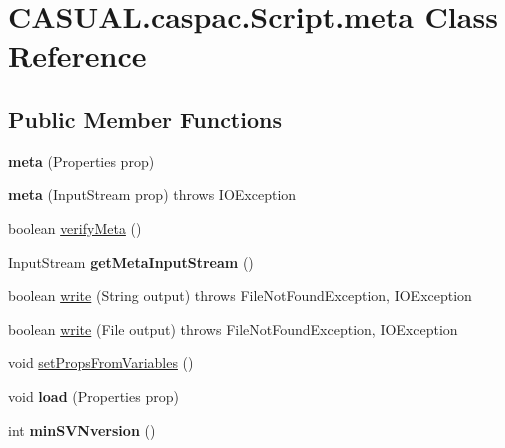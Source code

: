 \hypertarget{classCASUAL_1_1caspac_1_1Script_1_1meta}{\section{C\-A\-S\-U\-A\-L.\-caspac.\-Script.\-meta Class Reference}
\label{classCASUAL_1_1caspac_1_1Script_1_1meta}
}
\subsection*{Public Member Functions}
\begin{DoxyCompactItemize}
\item 
\hypertarget{classCASUAL_1_1caspac_1_1Script_1_1meta_a261edd605871c12eae55492b767f5d91}{{\bfseries meta} (Properties prop)}\label{classCASUAL_1_1caspac_1_1Script_1_1meta_a261edd605871c12eae55492b767f5d91}

\item 
\hypertarget{classCASUAL_1_1caspac_1_1Script_1_1meta_a82642004af42f27e39b25701f959366c}{{\bfseries meta} (Input\-Stream prop)  throws I\-O\-Exception }\label{classCASUAL_1_1caspac_1_1Script_1_1meta_a82642004af42f27e39b25701f959366c}

\item 
boolean \hyperlink{classCASUAL_1_1caspac_1_1Script_1_1meta_a4340eebaf11efe0a5be240ac719287c9}{verify\-Meta} ()
\item 
\hypertarget{classCASUAL_1_1caspac_1_1Script_1_1meta_ac00ebebaaa934593f664e4f8a992dac1}{Input\-Stream {\bfseries get\-Meta\-Input\-Stream} ()}\label{classCASUAL_1_1caspac_1_1Script_1_1meta_ac00ebebaaa934593f664e4f8a992dac1}

\item 
boolean \hyperlink{classCASUAL_1_1caspac_1_1Script_1_1meta_abd994423729ec381ff3d2ce236981533}{write} (String output)  throws File\-Not\-Found\-Exception, I\-O\-Exception 
\item 
boolean \hyperlink{classCASUAL_1_1caspac_1_1Script_1_1meta_a24fe150d261aea726080f70c0403a81e}{write} (File output)  throws File\-Not\-Found\-Exception, I\-O\-Exception 
\item 
void \hyperlink{classCASUAL_1_1caspac_1_1Script_1_1meta_a356836bc34bf0e4bc68ee064277660db}{set\-Props\-From\-Variables} ()
\item 
\hypertarget{classCASUAL_1_1caspac_1_1Script_1_1meta_a2d21562b3e0b7d4fcdb1089817ab9eca}{void {\bfseries load} (Properties prop)}\label{classCASUAL_1_1caspac_1_1Script_1_1meta_a2d21562b3e0b7d4fcdb1089817ab9eca}

\item 
\hypertarget{classCASUAL_1_1caspac_1_1Script_1_1meta_a451f01951a3e308647fc725fdcc50b7d}{int {\bfseries min\-S\-V\-Nversion} ()}\label{classCASUAL_1_1caspac_1_1Script_1_1meta_a451f01951a3e308647fc725fdcc50b7d}

\end{DoxyCompactItemize}
